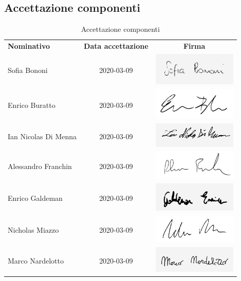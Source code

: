 \documentclass[../piano-di-progetto.tex]{subfiles}
\begin{document}
  \subsection{Accettazione componenti}

  \begin{table}[H]
    \centering
    \begin{tabular}{lcc}
      \rowcolor{lightgray}
      \textbf{Nominativo}  & \textbf{Data accettazione} & \textbf{Firma}  \\
      Sofia Bononi & 2020-03-09 & \includegraphics[width=4cm]{img/sofia-g.png} \\
      Enrico Buratto & 2020-03-09 & \includegraphics[width=4cm]{img/enricob.png}     \\
      Ian Nicolas Di Menna & 2020-03-09 & \includegraphics[width=4cm]{img/ian-g.png}     \\
      Alessandro Franchin & 2020-03-09 & \includegraphics[width=4cm]{img/ale.png}     \\
      Enrico Galdeman & 2020-03-09 & \includegraphics[width=4cm]{img/enricog-g.png}     \\
      Nicholas Miazzo & 2020-03-09 & \includegraphics[width=4cm]{img/nicholas.png}     \\
      Marco Nardelotto & 2020-03-09 & \includegraphics[width=4cm]{img/marco-g.png}
    \end{tabular}
    \caption{Accettazione componenti}
  \end{table}
\end{document}
